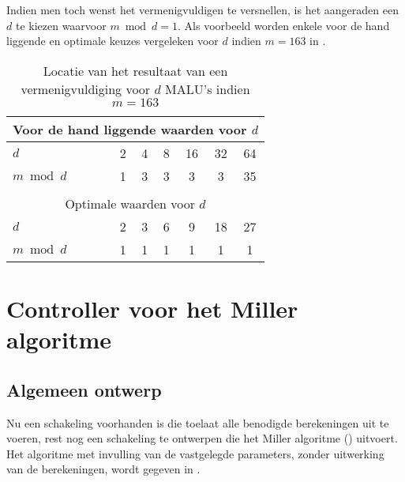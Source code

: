 Indien men toch wenst het vermenigvuldigen te versnellen, is het aangeraden een $d$ te kiezen waarvoor $m \bmod d = 1$. Als voorbeeld worden enkele voor de hand liggende en optimale keuzes vergeleken voor $d$ indien $m = 163$ in .

\begin{table}[h]
	\caption{Locatie van het resultaat van een vermenigvuldiging voor $d$ MALU's indien \mbox{$m=163$}}
	\label{tabel-implementatie-woordbreedte-d}

	\centering
	\begin{tabular}{lcccccc}
		\toprule
		\multicolumn{7}{c}{Voor de hand liggende waarden voor $d$}\\
		\midrule
		$d$			& 2	& 4	& 8	& 16	& 32	& 64\\
		$m \bmod d \qquad$	& 1	& 3	& 3	& 3	& 3	& 35\\
		\bottomrule
		\multicolumn{7}{c}{}\\
		\toprule
		\multicolumn{7}{c}{Optimale waarden voor $d$}\\
		\midrule
		$d$			& 2	& 3	& 6	& 9	& 18	& 27\\
		$m \bmod d$	& 1	& 1	& 1	& 1	& 1	& 1\\
		\bottomrule
	\end{tabular}
\end{table}

\section{Controller voor het Miller algoritme\label{sectie-implementatie-miller}}

\subsection{Algemeen ontwerp\label{subsectie-implementatie-miller-ontwerp}}

Nu een schakeling voorhanden is die toelaat alle benodigde berekeningen uit te voeren, rest nog een schakeling te ontwerpen die het Miller algoritme () uitvoert. Het algoritme met invulling van de vastgelegde parameters, zonder uitwerking van de berekeningen, wordt gegeven in .


